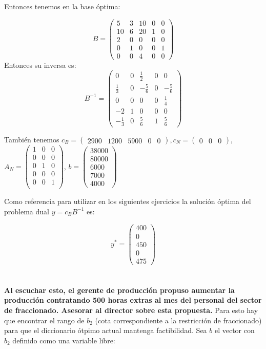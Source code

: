 \documentclass[10pt,a4paper]{article}
\begin{document}
Entonces tenemos en la base óptima:

\[B = \begin{pmatrix}
	5  & 3 & 10 & 0 & 0 \\
	10 & 6 & 20 & 1 & 0 \\
	2  & 0 & 0  & 0 & 0 \\
	0  & 1 & 0  & 0 & 1 \\
	0  & 0 & 4  & 0 & 0
\end{pmatrix}\]
Entonces su inversa es:
\[B^{-1} = \begin{pmatrix}
	0  & 0 &\frac{1}{2} & 0 & 0 \\
	\frac{1}{3} & 0 & -\frac{5}{6} & 0 & -\frac{5}{6} \\
	0  & 0 & 0  & 0 & \frac{1}{4} \\
	-2 & 1 & 0  & 0 & 0 \\
	-\frac{1}{3}  & 0 & \frac{5}{6}  & 1 & \frac{5}{6}
\end{pmatrix}\]

También tenemos $c_B = \begin{pmatrix} 2900 & 1200 & 5900 & 0 & 0 \end{pmatrix}, c_N = \begin{pmatrix} 0 & 0 & 0 \end{pmatrix}$, $A_N = \begin{pmatrix}
	1 & 0 & 0 \\
	0 & 0 & 0 \\
	0 & 1 & 0 \\
	0 & 0 & 0 \\
	0 & 0 & 1 \\
\end{pmatrix}$, $b = \begin{pmatrix}
38000 \\
80000 \\
6000 \\
7000 \\
4000
\end{pmatrix}$

Como referencia para utilizar en los siguientes ejercicios la solución óptima del problema dual $y=c_B B^{-1}$ es:

$$
y^* = \begin{pmatrix}
	400 \\
	0 \\
	450 \\
	0 \\
	475
\end{pmatrix}
$$

\section{} %
\textbf{Al escuchar esto, el gerente de producción propuso aumentar la producción contratando 500 horas extras al mes del personal del sector de fraccionado. Asesorar al director sobre esta propuesta.}
Para esto hay que encontrar el rango de $b_2$ (cota correspondiente a la restricción de fraccionado) para que el diccionario ótpimo actual mantenga factibilidad. Sea $b$ el vector con $b_2$ definido como una variable libre:
\end{document}
